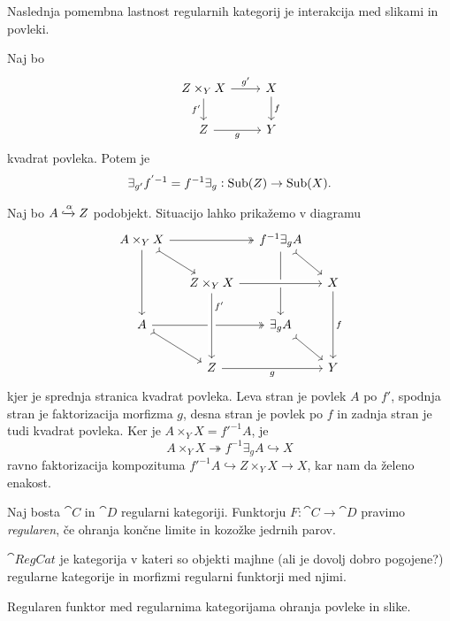 \documentclass[../kategoricna_logika.tex]{subfiles}
\begin{document}
Naslednja pomembna lastnost regularnih kategorij je interakcija med
slikami in povleki.
\begin{lema}\label{lema:zamenjava-povleka-in-slike}
  Naj bo
  \begin{equation*}
    \begin{tikzcd}
      Z \times_Y X \ar[d, "f'"'] \ar[r, "g'"] & X \ar[d, "f"] \\
      Z \ar[r, "g"'] & Y
    \end{tikzcd}
  \end{equation*}
  kvadrat povleka. Potem je
  $$\exists_{g'}f^{'-1} = f^{-1}\exists_g : \operatorname{Sub}(Z) \to \operatorname{Sub}(X).$$
\end{lema}
\begin{dokaz}
  Naj bo $A \xhookrightarrow{\alpha} Z$ podobjekt.  Situacijo lahko
  prikažemo v diagramu
  \begin{equation*}
    \begin{tikzcd}[column sep=small]
      A \times_Y X \ar[dd] \ar[dr, tail] \ar[rr, two heads] & &
      f^{-1}\exists_g A \ar[dd] \ar[dr, tail] & \\
      & Z \times_Y X  \ar[rr, crossing over] & & X \ar[dd, "f"] \\
      A \ar[dr, tail] \ar[rr, two heads] & & \exists_g A \ar[dr, tail] & \\
      & Z \ar[rr, "g"'] \ar[from=uu, pos=0.2, crossing over, "f'"] & &
      Y
    \end{tikzcd}
  \end{equation*}
  kjer je sprednja stranica kvadrat povleka.  Leva stran je povlek $A$
  po $f'$, spodnja stran je faktorizacija morfizma $g$, desna stran je
  povlek po $f$ in zadnja stran je tudi kvadrat povleka.  Ker je
  $A \times_Y X = f'^{-1}A$, je
  \[A \times_Y X \twoheadrightarrow f^{-1}\exists_g A \hookrightarrow
    X\] ravno faktorizacija kompozituma
  $f'^{-1}A \hookrightarrow Z \times_Y X \to X$, kar nam da želeno
  enakost.
\end{dokaz}
\begin{definicija}
  Naj bosta $\cat{C}$ in $\cat{D}$ regularni kategoriji.  Funktorju
  ${F : \cat{C} \to \cat{D}}$ pravimo \emph{regularen}, če ohranja
  končne limite in kozožke jedrnih parov.
\end{definicija}
\begin{definicija}
  $\cat{RegCat}$ je kategorija v kateri so objekti majhne (ali je
  dovolj dobro pogojene?) regularne kategorije in morfizmi regularni
  funktorji med njimi.
\end{definicija}
\begin{lema}
  Regularen funktor med regularnima kategorijama ohranja povleke in
  slike.
\end{lema}
\end{document}
